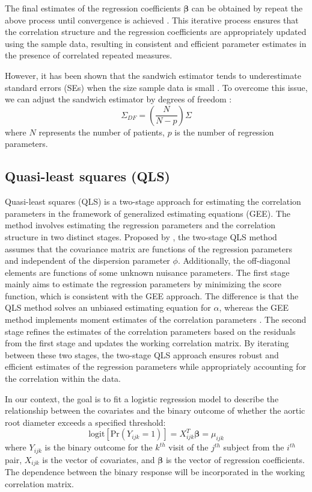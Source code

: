 \documentclass[
]{aft}
\begin{document}
The final estimates of the regression coefficients
\(\boldsymbol{\beta}\) can be obtained by repeat the above process until
convergence is achieved \citep{Liang1986}. This iterative process
ensures that the correlation structure and the regression coefficients
are appropriately updated using the sample data, resulting in consistent
and efficient parameter estimates in the presence of correlated repeated
measures.

However, it has been shown that the sandwich estimator tends to
underestimate standard errors (SEs) when the size sample data is small
\citep{Mitani2019}. To overcome this issue, we can adjust the sandwich
estimator by degrees of freedom \citep{dfcorrect}: \begin{equation}
\Sigma_{DF} = (\frac{N}{N-p})\Sigma \label{eq:geeSigmaDF}
\end{equation} where \(N\) represents the number of patients, \(p\) is
the number of regression parameters.

\subsection{Quasi-least squares (QLS)}\label{quasi-least-squares-qls}

Quasi-least squares (QLS) is a two-stage approach for estimating the
correlation parameters in the framework of generalized estimating
equations (GEE). The method involves estimating the regression
parameters and the correlation structure in two distinct stages.
Proposed by \citet{qls}, the two-stage QLS method assumes that the
covariance matrix are functions of the regression parameters and
independent of the dispersion parameter \(\phi\). Additionally, the
off-diagonal elements are functions of some unknown nuisance parameters.
The first stage mainly aims to estimate the regression parameters by
minimizing the score function, which is consistent with the GEE
approach. The difference is that the QLS method solves an unbiased
estimating equation for \(\alpha\), whereas the GEE method implements
moment estimates of the correlation parameters \citep{qlspack}. The
second stage refines the estimates of the correlation parameters based
on the residuals from the first stage and updates the working
correlation matrix. By iterating between these two stages, the two-stage
QLS approach ensures robust and efficient estimates of the regression
parameters while appropriately accounting for the correlation within the
data.

In our context, the goal is to fit a logistic regression model to
describe the relationship between the covariates and the binary outcome
of whether the aortic root diameter exceeds a specified threshold:
\begin{equation}
\text{logit}[\text{Pr}(Y_{ijk} = 1)] = X_{ijk}^T \boldsymbol{\beta} = \mu_{ijk} \label{eq:qlsMarginExpectation}
\end{equation} where \(Y_{ijk}\) is the binary outcome for the
\(k^{th}\) visit of the \(j^{th}\) subject from the \(i^{th}\) pair,
\(X_{ijk}\) is the vector of covariates, and \(\boldsymbol{\beta}\) is
the vector of regression coefficients. The dependence between the binary
response will be incorporated in the working correlation matrix.
\end{document}
